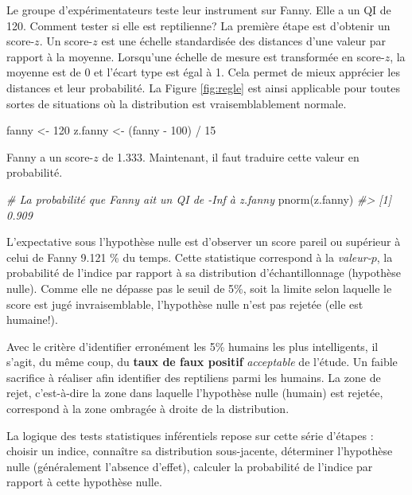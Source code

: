 \documentclass[
]{book}
\newenvironment{Shaded}{}{}
\newcommand{\CommentTok}[1]{\textit{#1}}
\newcommand{\DecValTok}[1]{#1}
\newcommand{\FunctionTok}[1]{#1}
\newcommand{\NormalTok}[1]{#1}
\newcommand{\OtherTok}[1]{#1}
\newcommand{\SpecialCharTok}[1]{#1}
\begin{document}
Le groupe d'expérimentateurs teste leur instrument sur Fanny. Elle a un QI de 120. Comment tester si elle est reptilienne? La première étape est d'obtenir un score-\(z\). Un score-\(z\) est une échelle standardisée des distances d'une valeur par rapport à la moyenne. Lorsqu'une échelle de mesure est transformée en score-\(z\), la moyenne est de 0 et l'écart type est égal à 1. Cela permet de mieux apprécier les distances et leur probabilité. La Figure \ref{fig:regle} est ainsi applicable pour toutes sortes de situations où la distribution est vraisemblablement normale.

\begin{Shaded}
\begin{Highlighting}[]
\NormalTok{fanny }\OtherTok{\textless{}{-}} \DecValTok{120}
\NormalTok{z.fanny }\OtherTok{\textless{}{-}}\NormalTok{ (fanny }\SpecialCharTok{{-}} \DecValTok{100}\NormalTok{) }\SpecialCharTok{/} \DecValTok{15}
\end{Highlighting}
\end{Shaded}

Fanny a un score-\(z\) de 1.333. Maintenant, il faut traduire cette valeur en probabilité.

\begin{Shaded}
\begin{Highlighting}[]
\CommentTok{\# La probabilité que Fanny ait un QI de {-}Inf à z.fanny}
\FunctionTok{pnorm}\NormalTok{(z.fanny)}
\CommentTok{\#\textgreater{} [1] 0.909}
\end{Highlighting}
\end{Shaded}

L'expectative sous l'hypothèse nulle est d'observer un score pareil ou supérieur à celui de Fanny 9.121 \% du temps. Cette statistique correspond à la \emph{valeur-\(p\)}, la probabilité de l'indice par rapport à sa distribution d'échantillonnage (hypothèse nulle). Comme elle ne dépasse pas le seuil de 5\%, soit la limite selon laquelle le score est jugé invraisemblable, l'hypothèse nulle n'est pas rejetée (elle est humaine!).

Avec le critère d'identifier erronément les 5\% humains les plus intelligents, il s'agit, du même coup, du \textbf{taux de faux positif} \emph{acceptable} de l'étude. Un faible sacrifice à réaliser afin identifier des reptiliens parmi les humains. La zone de rejet, c'est-à-dire la zone dans laquelle l'hypothèse nulle (humain) est rejetée, correspond à la zone ombragée à droite de la distribution.

La logique des tests statistiques inférentiels repose sur cette série d'étapes : choisir un indice, connaître sa distribution sous-jacente, déterminer l'hypothèse nulle (généralement l'absence d'effet), calculer la probabilité de l'indice par rapport à cette hypothèse nulle.
\end{document}
